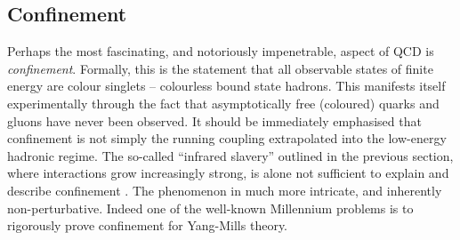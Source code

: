 \documentclass[11pt, a4paper, twoside]{book}
\begin{document}
\subsection{Confinement}
\label{sec:confinement}
Perhaps the most fascinating, and notoriously impenetrable, aspect of QCD is \emph{confinement}. Formally, this is the statement that all observable states of finite energy are colour singlets -- colourless bound state hadrons. This manifests itself experimentally through the fact that asymptotically free (coloured) quarks and gluons have never been observed. It should be immediately emphasised that confinement is not simply the running coupling extrapolated into the low-energy hadronic regime. The so-called ``infrared slavery'' outlined in the previous section, where interactions grow increasingly strong, is alone not sufficient to explain and describe confinement \cite{Greensite:2003bk}. The phenomenon in much more intricate, and inherently non-perturbative. Indeed one of the well-known Millennium problems \cite{Clay_problem} is to rigorously prove confinement for Yang-Mills theory.
\end{document}
